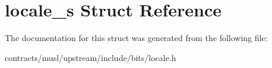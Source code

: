 \hypertarget{structlocale__s}{}\section{locale\+\_\+s Struct Reference}
\label{structlocale__s}


The documentation for this struct was generated from the following file\+:\begin{DoxyCompactItemize}
\item 
contracts/musl/upstream/include/bits/locale.\+h\end{DoxyCompactItemize}
